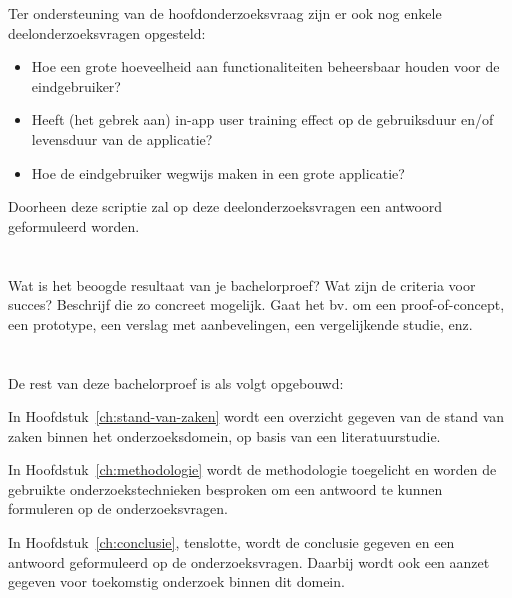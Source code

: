 Ter ondersteuning van de hoofdonderzoeksvraag zijn er ook nog enkele deelonderzoeksvragen opgesteld:

\begin{itemize}
    \item Hoe een grote hoeveelheid aan functionaliteiten beheersbaar houden voor de eindgebruiker?
    \item Heeft (het gebrek aan) in-app user training effect op de gebruiksduur en/of levensduur van de applicatie?
    \item Hoe de eindgebruiker wegwijs maken in een grote applicatie?
\end{itemize}

Doorheen deze scriptie zal op deze deelonderzoeksvragen een antwoord geformuleerd worden.

\section{}
\label{sec:onderzoeksdoelstelling}

Wat is het beoogde resultaat van je bachelorproef? Wat zijn de criteria voor succes? Beschrijf die zo concreet mogelijk. Gaat het bv. om een proof-of-concept, een prototype, een verslag met aanbevelingen, een vergelijkende studie, enz.

\section{}
\label{sec:opzet-bachelorproef}


De rest van deze bachelorproef is als volgt opgebouwd:

In Hoofdstuk~\ref{ch:stand-van-zaken} wordt een overzicht gegeven van de stand van zaken binnen het onderzoeksdomein, op basis van een literatuurstudie.

In Hoofdstuk~\ref{ch:methodologie} wordt de methodologie toegelicht en worden de gebruikte onderzoekstechnieken besproken om een antwoord te kunnen formuleren op de onderzoeksvragen.


In Hoofdstuk~\ref{ch:conclusie}, tenslotte, wordt de conclusie gegeven en een antwoord geformuleerd op de onderzoeksvragen. Daarbij wordt ook een aanzet gegeven voor toekomstig onderzoek binnen dit domein.